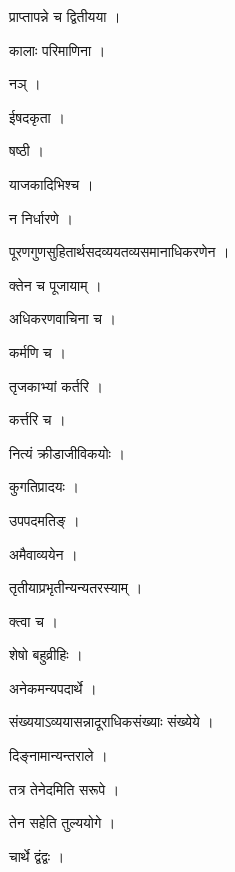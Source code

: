 \documentclass[10pt, openany]{book}
\begin{document}
\noindent प्राप्तापन्ने च द्वितीयया ।

\noindent कालाः परिमाणिना ।

\noindent नञ् ।

\noindent ईषदकृता ।

\noindent षष्ठी ।

\noindent याजकादिभिश्च ।

\noindent न निर्धारणे ।

\noindent पूरणगुणसुहितार्थसदव्ययतव्यसमानाधिकरणेन ।

\noindent क्तेन च पूजायाम् ।

\noindent अधिकरणवाचिना च ।

\noindent कर्मणि च ।

\noindent तृजकाभ्यां कर्तरि ।

\noindent कर्त्तरि च ।

\noindent नित्यं क्रीडाजीविकयोः ।

\noindent कुगतिप्रादयः ।

\noindent उपपदमतिङ् ।

\noindent अमैवाव्ययेन ।

\noindent तृतीयाप्रभृतीन्यन्यतरस्याम् ।

\noindent क्त्वा च ।

\noindent शेषो बहुव्रीहिः ।

\noindent अनेकमन्यपदार्थे ।

\noindent संख्ययाऽव्ययासन्नादूराधिकसंख्याः संख्येये ।

\noindent दिङ्नामान्यन्तराले ।

\noindent तत्र तेनेदमिति सरूपे ।

\noindent तेन सहेति तुल्ययोगे ।

\noindent चार्थे द्वंद्वः ।
\end{document}
